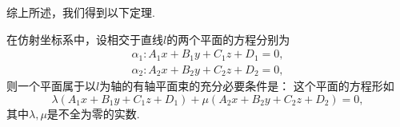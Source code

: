 综上所述，我们得到以下定理.
\begin{theorem}
在仿射坐标系中，设相交于直线\(l\)的两个平面的方程分别为\begin{equation*}
	\begin{split}
		\alpha_1: A_1 x + B_1 y + C_1 z + D_1 = 0, \\
		\alpha_2: A_2 x + B_2 y + C_2 z + D_2 = 0,
	\end{split}
\end{equation*}
则一个平面属于以\(l\)为轴的有轴平面束的充分必要条件是：
这个平面的方程形如\begin{equation*}
	\lambda	(A_1 x + B_1 y + C_1 z + D_1)
	+ \mu	(A_2 x + B_2 y + C_2 z + D_2) = 0,
\end{equation*}
其中\(\lambda,\mu\)是不全为零的实数.
\end{theorem}
